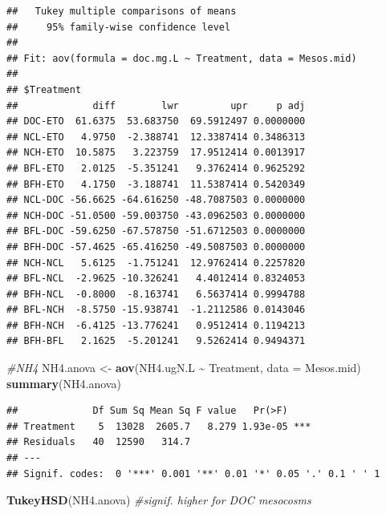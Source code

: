 \documentclass[
]{article}
\newenvironment{Shaded}{\begin{snugshade}}{\end{snugshade}}
\newcommand{\AttributeTok}[1]{\textcolor[rgb]{0.13,0.29,0.53}{#1}}
\newcommand{\CommentTok}[1]{\textcolor[rgb]{0.56,0.35,0.01}{\textit{#1}}}
\newcommand{\FunctionTok}[1]{\textcolor[rgb]{0.13,0.29,0.53}{\textbf{#1}}}
\newcommand{\NormalTok}[1]{#1}
\newcommand{\OtherTok}[1]{\textcolor[rgb]{0.56,0.35,0.01}{#1}}
\newcommand{\SpecialCharTok}[1]{\textcolor[rgb]{0.81,0.36,0.00}{\textbf{#1}}}
\begin{document}
\begin{verbatim}
##   Tukey multiple comparisons of means
##     95% family-wise confidence level
## 
## Fit: aov(formula = doc.mg.L ~ Treatment, data = Mesos.mid)
## 
## $Treatment
##             diff        lwr         upr     p adj
## DOC-ETO  61.6375  53.683750  69.5912497 0.0000000
## NCL-ETO   4.9750  -2.388741  12.3387414 0.3486313
## NCH-ETO  10.5875   3.223759  17.9512414 0.0013917
## BFL-ETO   2.0125  -5.351241   9.3762414 0.9625292
## BFH-ETO   4.1750  -3.188741  11.5387414 0.5420349
## NCL-DOC -56.6625 -64.616250 -48.7087503 0.0000000
## NCH-DOC -51.0500 -59.003750 -43.0962503 0.0000000
## BFL-DOC -59.6250 -67.578750 -51.6712503 0.0000000
## BFH-DOC -57.4625 -65.416250 -49.5087503 0.0000000
## NCH-NCL   5.6125  -1.751241  12.9762414 0.2257820
## BFL-NCL  -2.9625 -10.326241   4.4012414 0.8324053
## BFH-NCL  -0.8000  -8.163741   6.5637414 0.9994788
## BFL-NCH  -8.5750 -15.938741  -1.2112586 0.0143046
## BFH-NCH  -6.4125 -13.776241   0.9512414 0.1194213
## BFH-BFL   2.1625  -5.201241   9.5262414 0.9494371
\end{verbatim}

\begin{Shaded}
\begin{Highlighting}[]
\CommentTok{\#NH4}
\NormalTok{NH4.anova }\OtherTok{\textless{}{-}} \FunctionTok{aov}\NormalTok{(NH4.ugN.L }\SpecialCharTok{\textasciitilde{}}\NormalTok{ Treatment, }\AttributeTok{data =}\NormalTok{ Mesos.mid)}
\FunctionTok{summary}\NormalTok{(NH4.anova)}
\end{Highlighting}
\end{Shaded}

\begin{verbatim}
##             Df Sum Sq Mean Sq F value   Pr(>F)    
## Treatment    5  13028  2605.7   8.279 1.93e-05 ***
## Residuals   40  12590   314.7                     
## ---
## Signif. codes:  0 '***' 0.001 '**' 0.01 '*' 0.05 '.' 0.1 ' ' 1
\end{verbatim}

\begin{Shaded}
\begin{Highlighting}[]
\FunctionTok{TukeyHSD}\NormalTok{(NH4.anova) }\CommentTok{\#signif. higher for DOC mesocosms}
\end{Highlighting}
\end{Shaded}
\end{document}
